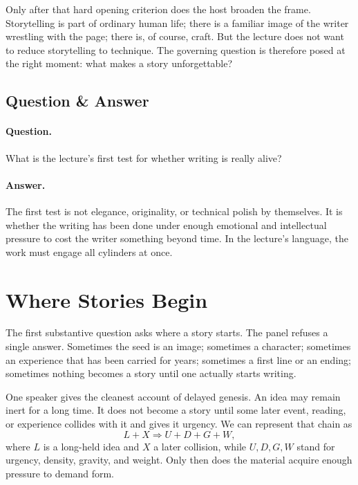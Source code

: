 Only after that hard opening criterion does the host broaden the frame. Storytelling is part of ordinary human life; there is a familiar image of the writer wrestling with the page; there is, of course, craft. But the lecture does not want to reduce storytelling to technique. The governing question is therefore posed at the right moment: what makes a story unforgettable?

\subsection{Question \& Answer}

\paragraph{Question.} What is the lecture's first test for whether writing is really alive?

\paragraph{Answer.} The first test is not elegance, originality, or technical polish by themselves. It is whether the writing has been done under enough emotional and intellectual pressure to cost the writer something beyond time. In the lecture's language, the work must engage all cylinders at once.

\section{Where Stories Begin}

The first substantive question asks where a story starts. The panel refuses a single answer. Sometimes the seed is an image; sometimes a character; sometimes an experience that has been carried for years; sometimes a first line or an ending; sometimes nothing becomes a story until one actually starts writing.

One speaker gives the cleanest account of delayed genesis. An idea may remain inert for a long time. It does not become a story until some later event, reading, or experience collides with it and gives it urgency. We can represent that chain as
\begin{equation}
L + X \Rightarrow U + D + G + W,
\end{equation}
where \(L\) is a long-held idea and \(X\) a later collision, while \(U,D,G,W\) stand for urgency, density, gravity, and weight. Only then does the material acquire enough pressure to demand form.

